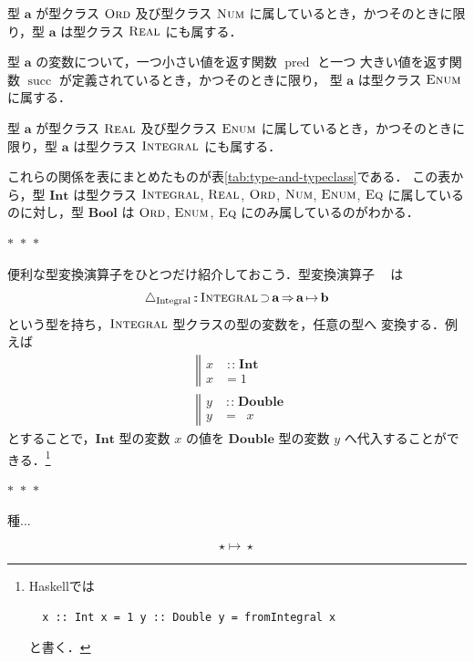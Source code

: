 \documentclass[a5paper,twoside,fleqn]{jsbook}
\newcommand{\separator}{\begin{center}$*$~$*$~$*$\end{center}}
\newcommand{\programminglanguage}[1]{\textsf{#1}}
\newcommand{\haskell}{\programminglanguage{Haskell}}
\newcommand{\mBrace}{\Vert}
\DeclareMathOperator{\mSuperClass}{\Rightarrow}
\DeclareMathOperator{\mSuperSet}{\supset}
\newcommand{\mUpCast}{\bigtriangleup}
\DeclareMathOperator{\mFromIntegral}{\mUpCast_\text{Integral}}
\newcommand{\mSpecialFunc}[1]{\mathrm{#1}}
\DeclareMathOperator{\mPred}{\mSpecialFunc{pred}}
\DeclareMathOperator{\mSucc}{\mSpecialFunc{succ}}
\DeclareMathOperator{\mIn}{{:\!:}}
\DeclareMathOperator{\mMapsTo}{\mapsto}
\newcommand{\mType}[1]{\mathbf{#1}}
\newcommand{\mBoolType}{\mType{Bool}}
\newcommand{\mDoubleType}{\mType{Double}}
\newcommand{\mIntType}{\mType{Int}}
\newcommand{\mGenericTypeClass}[1]{\textsc{#1}} %
\newcommand{\mEnumTypeClass}{\mGenericTypeClass{Enum}}
\newcommand{\mEqTypeClass}{\mGenericTypeClass{Eq}}
\newcommand{\mIntegralTypeClass}{\mGenericTypeClass{Integral}}
\newcommand{\mNumTypeClass}{\mGenericTypeClass{Num}}
\newcommand{\mOrdTypeClass}{\mGenericTypeClass{Ord}}
\newcommand{\mRealTypeClass}{\mGenericTypeClass{Real}}
\newcommand{\mProj}[2]{#1\mMapsTo#2}
\begin{document}
型 $\mType{a}$ が型クラス $\mOrdTypeClass$ 及び型クラス
$\mNumTypeClass$ に属しているとき，かつそのときに限り，型 $\mType{a}$
は型クラス $\mRealTypeClass$ にも属する．

型 $\mType{a}$ の変数について，一つ小さい値を返す関数 $\mPred$ と一つ
大きい値を返す関数 $\mSucc$ が定義されているとき，かつそのときに限り，
型 $\mType{a}$ は型クラス $\mEnumTypeClass$ に属する．

型 $\mType{a}$ が型クラス $\mRealTypeClass$ 及び型クラス
$\mEnumTypeClass$ に属しているとき，かつそのときに限り，型 $\mType{a}$
は型クラス $\mIntegralTypeClass$ にも属する．

これらの関係を表にまとめたものが表\ref{tab:type-and-typeclass}である．
この表から，型 $\mIntType$ は型クラス $\mIntegralTypeClass$,
$\mRealTypeClass$, $\mOrdTypeClass$, $\mNumTypeClass$,
$\mEnumTypeClass$, $\mEqTypeClass$ に属しているのに対し，型
$\mBoolType$ は $\mOrdTypeClass$, $\mEnumTypeClass$, $\mEqTypeClass$
にのみ属しているのがわかる．

\separator

便利な型変換演算子をひとつだけ紹介しておこう．型変換演算子
$\mFromIntegral$ は
\begin{equation}
\mFromIntegral \mIn{}\mIntegralTypeClass\mSuperSet\mType{a}
\mSuperClass\mProj{\mType{a}}{\mType{b}}
\end{equation}
という型を持ち，$\mIntegralTypeClass$ 型クラスの型の変数を，任意の型へ
変換する．例えば
\begin{align}
{}&\left\mBrace\begin{aligned} x&\mIn\mIntType\\ x&=1
\end{aligned}\right.\\
{}&\left\mBrace\begin{aligned} y&\mIn\mDoubleType\\ y&=\mFromIntegral
x
\end{aligned}\right.
\end{align}
とすることで，$\mIntType$ 型の変数 $x$ の値を $\mDoubleType$ 型の変数
$y$ へ代入することができる．\footnote{\haskell では
\begin{verbatim}
  x :: Int x = 1 y :: Double y = fromIntegral x
\end{verbatim}
と書く．}

\separator

種...

\begin{equation*}
\mProj{\star}{\star}
\end{equation*}
\end{document}
